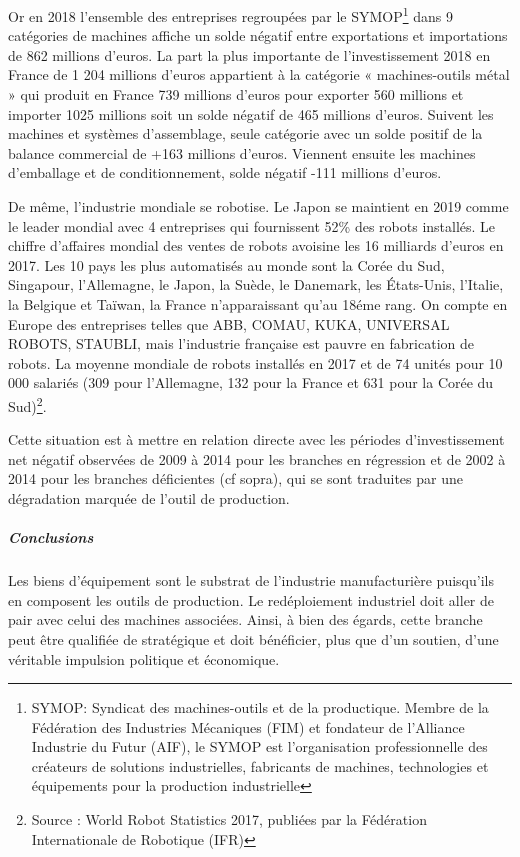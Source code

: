 \documentclass[a4paper]{article}
\begin{document}
Or en 2018 l’ensemble des entreprises regroupées par le SYMOP\footnote{SYMOP: Syndicat des machines-outils et de la productique. Membre de la Fédération des Industries Mécaniques (FIM) et fondateur de l’Alliance Industrie du Futur (AIF), le SYMOP est l'organisation professionnelle des créateurs de solutions industrielles, fabricants de machines, technologies et équipements pour la production industrielle} dans 9 catégories de machines affiche un solde négatif entre exportations et importations de 862 millions d’euros. La part la plus importante de l’investissement 2018 en France de 1 204 millions d’euros appartient à la catégorie « machines-outils métal » qui produit en France 739 millions d’euros pour exporter 560 millions et importer 1025 millions soit un solde négatif de 465 millions d’euros. Suivent les machines et systèmes d’assemblage, seule catégorie avec un solde positif de la balance commercial de +163 millions d’euros. Viennent ensuite les machines d’emballage et de conditionnement, solde négatif -111 millions d’euros. 

De même, l’industrie mondiale se robotise. Le Japon se maintient en 2019 comme le leader mondial avec 4 entreprises qui fournissent 52\% des robots installés. Le chiffre d'affaires mondial des ventes de robots avoisine les 16 milliards d’euros en 2017.  Les 10 pays les plus automatisés au monde sont la Corée du Sud, Singapour, l'Allemagne, le Japon, la Suède, le Danemark, les États-Unis, l'Italie, la Belgique et Taïwan, la France n’apparaissant qu’au 18éme rang. On compte en Europe des entreprises telles que ABB, COMAU, KUKA, UNIVERSAL  ROBOTS, STAUBLI, mais l’industrie française est pauvre en fabrication de robots. La moyenne mondiale de robots installés en 2017 et de 74 unités pour 10 000 salariés (309 pour l'Allemagne, 132 pour la France et 631 pour la Corée du Sud)\footnote{Source : World Robot Statistics 2017, publiées par la Fédération Internationale de Robotique (IFR)}.

Cette situation est à mettre en relation directe avec les périodes d’investissement net négatif observées de 2009 à 2014 pour les branches en régression et de 2002 à 2014 pour les branches déficientes (cf sopra), qui se sont traduites par une dégradation marquée de l’outil de production.

\subparagraph{Conclusions}
Les biens d’équipement sont le substrat de l’industrie manufacturière puisqu’ils en composent les outils de production. Le redéploiement industriel doit aller de pair avec celui des machines associées. Ainsi, à bien des égards, cette branche peut être qualifiée de stratégique et doit bénéficier, plus que d’un soutien, d’une véritable impulsion politique et économique.
\end{document}
